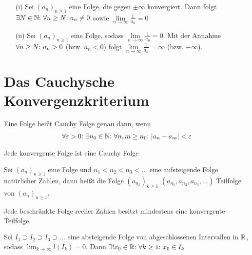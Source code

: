 \begin{framedthm}
	\begin{enumerate}
		\item[(i)] Sei $(a_n)_{n\geq 1}$ eine Folge, die gegen $\pm \infty$ konvergiert. Dann folgt $\exists N \in \mathbb{N}{:}\  \forall n \geq N{:}\  a_n \neq 0$ sowie $\lim\limits_{n \to \infty} \frac{1}{a_n} = 0$
		\item[(ii)] Sei $(a_n)_{n\geq 1}$ eine Folge, sodass $\lim\limits_{n \to \infty} \frac{1}{a_n} = 0$. Mit der Annahme $\forall n \geq N{:}\  a_n > 0$ (bzw. $a_n < 0$) folgt $\lim\limits_{n \to \infty} \frac{1}{a_n} = \infty$ (bzw. $-\infty$).
	\end{enumerate}
\end{framedthm}

\newpage
\section{Das Cauchysche Konvergenzkriterium}

\begin{frameddefn}
	Eine Folge heißt Cauchy Folge genau dann, wenn\begin{align*}
		\forall \varepsilon > 0{:}\  \exists n_0 \in \mathbb{N}{:}\  \forall n,m \geq n_0{:}\  |a_n - a_m| < \varepsilon
	\end{align*}
\end{frameddefn}


\begin{framedthm}
	Jede konvergente Folge ist eine Cauchy Folge
\end{framedthm}

\begin{frameddefn}[Teilfolgen]
	Sei $(a_n)_{n\geq 1}$ eine Folge und $n_1 < n_2 < n_3 < ...$ eine aufsteigende Folge natürlicher Zahlen, dann heißt die Folge $(a_{n_k})_{k \geq 1}$ $(a_{n_1}, a_{n_2}, a_{n_3}, ...)$ Teilfolge von $(a_n)_{n\geq 1}$.
\end{frameddefn}

\begin{framedthm}
	Jede beschränkte Folge reeller Zahlen besitzt mindestens eine konvergente Teilfolge.
\end{framedthm}

\begin{framedthm}
	Sei $I_1 \supset I_2 \supset I_3 \supset ...$ eine absteigende Folge von abgeschlossenen Intervallen in $\mathbb{R}$, sodass $\lim_{k \to \infty} l(I_k) = 0$. Dann $\exists! x_0 \in \mathbb{R}{:}\  \forall k \geq 1{:}\  x_0 \in I_k$
\end{framedthm}

